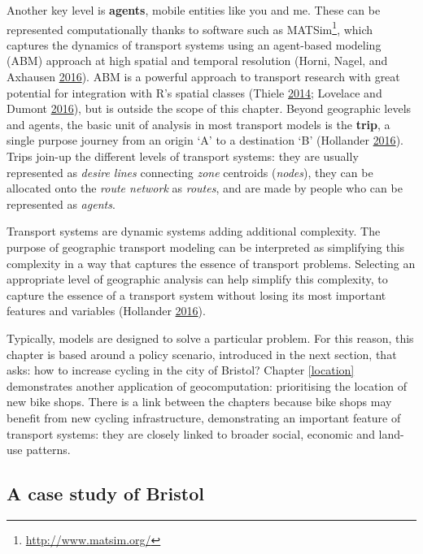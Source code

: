 \documentclass[]{krantz}
\let\rmarkdownfootnote\footnote%
\def\footnote{\protect\rmarkdownfootnote}
\renewcommand{\href}[2]{#2\footnote{\url{#1}}}
\begin{document}
Another key level is \textbf{agents}, mobile entities like you and me.
These can be represented computationally thanks to software such as \href{http://www.matsim.org/}{MATSim}, which captures the dynamics of transport systems using an agent-based modeling (ABM) approach at high spatial and temporal resolution (Horni, Nagel, and Axhausen \protect\hyperlink{ref-horni_multi-agent_2016}{2016}).
ABM is a powerful approach to transport research with great potential for integration with R's spatial classes (Thiele \protect\hyperlink{ref-thiele_r_2014}{2014}; Lovelace and Dumont \protect\hyperlink{ref-lovelace_spatial_2016}{2016}), but is outside the scope of this chapter.
Beyond geographic levels and agents, the basic unit of analysis in most transport models is the \textbf{trip}, a single purpose journey from an origin `A' to a destination `B' (Hollander \protect\hyperlink{ref-hollander_transport_2016}{2016}).
Trips join-up the different levels of transport systems: they are usually represented as \emph{desire lines} connecting \emph{zone} centroids (\emph{nodes}), they can be allocated onto the \emph{route network} as \emph{routes}, and are made by people who can be represented as \emph{agents}.

Transport systems are dynamic systems adding additional complexity.
The purpose of geographic transport modeling can be interpreted as simplifying this complexity in a way that captures the essence of transport problems.
Selecting an appropriate level of geographic analysis can help simplify this complexity, to capture the essence of a transport system without losing its most important features and variables (Hollander \protect\hyperlink{ref-hollander_transport_2016}{2016}).

Typically, models are designed to solve a particular problem.
For this reason, this chapter is based around a policy scenario, introduced in the next section, that asks:
how to increase cycling in the city of Bristol?
Chapter \ref{location} demonstrates another application of geocomputation:
prioritising the location of new bike shops.
There is a link between the chapters because bike shops may benefit from new cycling infrastructure, demonstrating an important feature of transport systems: they are closely linked to broader social, economic and land-use patterns.

\hypertarget{bris-case}{%
\subsection{A case study of Bristol}\label{bris-case}}
\end{document}
